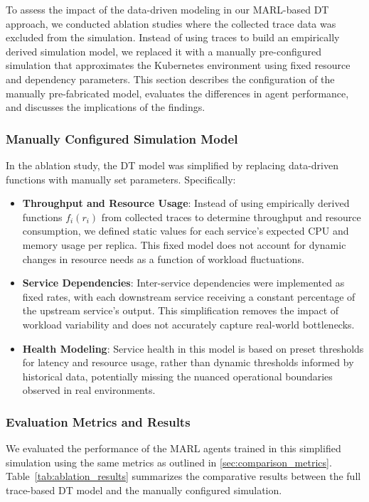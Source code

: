 \documentclass[conference]{IEEEtran}
\begin{document}
To assess the impact of the data-driven modeling in our MARL-based DT approach, we conducted ablation studies where the collected trace data was excluded from the simulation. Instead of using traces to build an empirically derived simulation model, we replaced it with a manually pre-configured simulation that approximates the Kubernetes environment using fixed resource and dependency parameters. This section describes the configuration of the manually pre-fabricated model, evaluates the differences in agent performance, and discusses the implications of the findings.

\subsubsection{Manually Configured Simulation Model}

In the ablation study, the DT model was simplified by replacing data-driven functions with manually set parameters. Specifically:
\begin{itemize}
    \item \textbf{Throughput and Resource Usage}: Instead of using empirically derived functions $f_i(r_i)$ from collected traces to determine throughput and resource consumption, we defined static values for each service’s expected CPU and memory usage per replica. This fixed model does not account for dynamic changes in resource needs as a function of workload fluctuations.
    \item \textbf{Service Dependencies}: Inter-service dependencies were implemented as fixed rates, with each downstream service receiving a constant percentage of the upstream service’s output. This simplification removes the impact of workload variability and does not accurately capture real-world bottlenecks.
    \item \textbf{Health Modeling}: Service health in this model is based on preset thresholds for latency and resource usage, rather than dynamic thresholds informed by historical data, potentially missing the nuanced operational boundaries observed in real environments.
\end{itemize}

\subsubsection{Evaluation Metrics and Results}

We evaluated the performance of the MARL agents trained in this simplified simulation using the same metrics as outlined in \autoref{sec:comparison_metrics}. Table~\ref{tab:ablation_results} summarizes the comparative results between the full trace-based DT model and the manually configured simulation.
\end{document}

